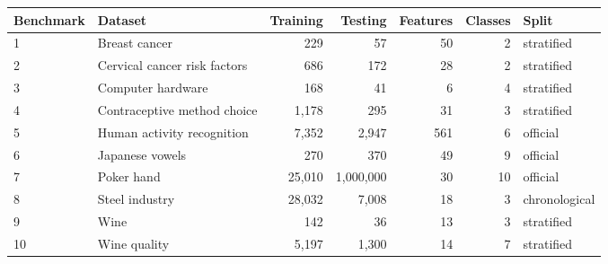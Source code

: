 \begin{tabular}{@{}lp{1.75in}rrrrl@{}}
\toprule
Benchmark & Dataset & Training & Testing & Features & Classes & Split \\
\midrule
1 & Breast cancer & 229 & 57 & 50 & 2 & stratified \\
2 & Cervical cancer risk factors & 686 & 172 & 28 & 2 & stratified \\
3 & Computer hardware & 168 & 41 & 6 & 4 & stratified \\
4 & Contraceptive method choice & 1,178 & 295 & 31 & 3 & stratified \\
5 & Human activity recognition & 7,352 & 2,947 & 561 & 6 & official \\
6 & Japanese vowels & 270 & 370 & 49 & 9 & official \\
7 & Poker hand & 25,010 & 1,000,000 & 30 & 10 & official \\
8 & Steel industry & 28,032 & 7,008 & 18 & 3 & chronological \\
9 & Wine & 142 & 36 & 13 & 3 & stratified \\
10 & Wine quality & 5,197 & 1,300 & 14 & 7 & stratified \\
\bottomrule
\end{tabular}
